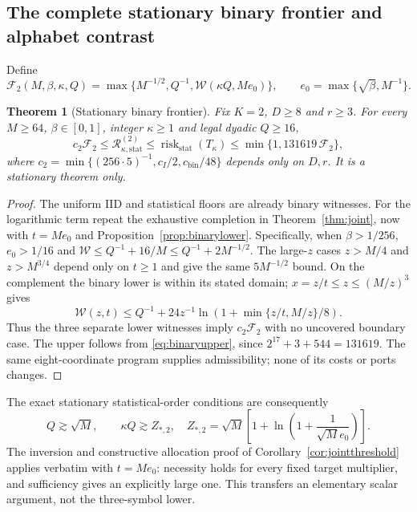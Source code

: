 \documentclass[11pt,letterpaper]{article}
\newtheorem{theorem}{Theorem}[section]
\theoremstyle{definition}\newtheorem{definition}[theorem]{Definition}
\theoremstyle{remark}\newtheorem{remark}[theorem]{Remark}
\newcommand{\Risk}{\mathcal{R}}
\begin{document}
\subsection{The complete stationary binary frontier and alphabet contrast}
Define
\[
 \mathcal F_2(M,\beta,\kappa,Q)
 =\max\{M^{-1/2},Q^{-1},\mathcal W(\kappa Q,Me_0)\},
 \qquad e_0=\max\{\sqrt\beta,M^{-1}\}.
\]
\begin{theorem}[Stationary binary frontier]\label{thm:binaryjoint}
Fix $K=2$, $D\ge8$ and $r\ge3$. For every $M\ge64$, $\beta\in[0,1]$, integer $\kappa\ge1$ and legal dyadic $Q\ge16$,
\begin{equation}\label{eq:binaryjoint}
 c_2\mathcal F_2\le\Risk_{\kappa,\mathrm{stat}}^{(2)}
 \le\operatorname{risk}_{\mathrm{stat}}(T_\kappa)
 \le\min\{1,131619\,\mathcal F_2\},
\end{equation}
where $c_2=\min\{(256\cdot5)^{-1},c_I/2,c_{\mathrm{bin}}/48\}$ depends only on $D,r$. It is a stationary theorem only.
\end{theorem}
\begin{proof}
The uniform IID and statistical floors are already binary witnesses. For the logarithmic term repeat the exhaustive completion in Theorem~\ref{thm:joint}, now with $t=Me_0$ and Proposition~\ref{prop:binarylower}. Specifically, when $\beta>1/256$, $e_0>1/16$ and
$\mathcal W\le Q^{-1}+16/M\le Q^{-1}+2M^{-1/2}$.
The large-$z$ cases $z>M/4$ and $z>M^{3/4}$ depend only on $t\ge1$ and give the same $5M^{-1/2}$ bound. On the complement the binary lower is within its stated domain; $x=z/t\le z\le(M/z)^3$ gives
\[
 \mathcal W(z,t)\le Q^{-1}
 +24z^{-1}\ln(1+\min\{z/t,M/z\}/8).
\]
Thus the three separate lower witnesses imply $c_2\mathcal F_2$ with no uncovered boundary case. The upper follows from \eqref{eq:binaryupper}, since
$2^{17}+3+544=131619$. The same eight-coordinate program supplies admissibility; none of its costs or ports changes.
\end{proof}

The exact stationary statistical-order conditions are consequently
\begin{equation}\label{eq:binarythreshold}
 Q\gtrsim\sqrt M,\qquad
 \kappa Q\gtrsim Z_{*,2},\quad
 Z_{*,2}=\sqrt M\left[1+\ln\left(1+\frac1{\sqrt M e_0}\right)\right].
\end{equation}
The inversion and constructive allocation proof of Corollary~\ref{cor:jointthreshold} applies verbatim with $t=Me_0$: necessity holds for every fixed target multiplier, and sufficiency gives an explicitly large one. This transfers an elementary scalar argument, not the three-symbol lower.
\end{document}
